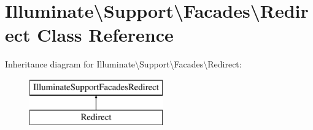 \hypertarget{class_illuminate_1_1_support_1_1_facades_1_1_redirect}{}\section{Illuminate\textbackslash{}Support\textbackslash{}Facades\textbackslash{}Redirect Class Reference}
\label{class_illuminate_1_1_support_1_1_facades_1_1_redirect}
Inheritance diagram for Illuminate\textbackslash{}Support\textbackslash{}Facades\textbackslash{}Redirect\+:\begin{figure}[H]
\begin{center}
\leavevmode
\includegraphics[height=2.000000cm]{class_illuminate_1_1_support_1_1_facades_1_1_redirect}
\end{center}
\end{figure}
